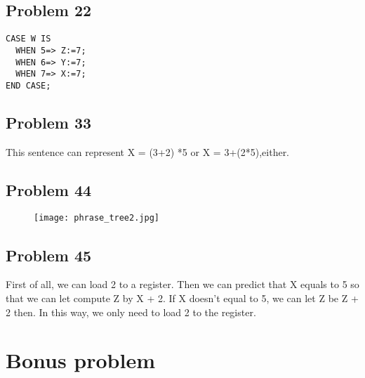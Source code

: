 \documentclass[11pt]{article}
\begin{document}
\subsection{Problem 22}

\begin{lstlisting}
CASE W IS
  WHEN 5=> Z:=7;
  WHEN 6=> Y:=7;
  WHEN 7=> X:=7;
END CASE;
\end{lstlisting}

\subsection{Problem 33}

This sentence can represent X = (3+2) *5 or X = 3+(2*5),either.

\subsection{Problem 44}


\begin{figure}[h]%
	\texttt{[image: phrase\_tree2.jpg]}  %
\end{figure}

\subsection{Problem 45}

First of all, we can load 2 to a register. Then we can predict that X equals to 5 so that we can let compute Z by X + 2. If X doesn't equal to 5, we can let Z be Z + 2 then. In this way, we only need to load 2 to the register.

\section{Bonus problem}
\end{document}
